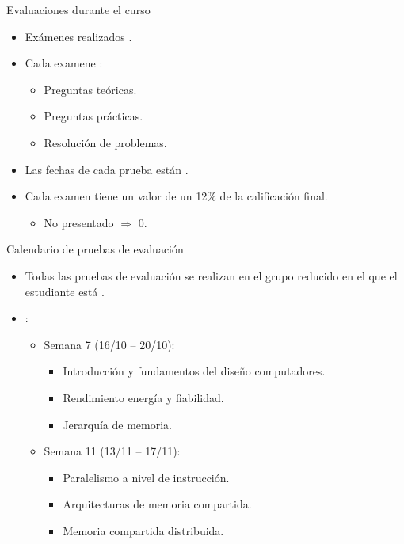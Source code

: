 \begin{frame}[t]{Evaluaciones durante el curso}
\begin{itemize}
  \item Exámenes realizados .

  \item Cada examene :
    \begin{itemize}
      \item Preguntas teóricas.
      \item Preguntas prácticas.
      \item Resolución de problemas.
    \end{itemize}

  \item Las fechas de cada prueba están .

  \item Cada examen tiene un valor de un 12\% de la calificación final.
    \begin{itemize}
      \item No presentado $\Rightarrow$ 0.
    \end{itemize}
\end{itemize}
\end{frame}

\begin{frame}[t]{Calendario de pruebas de evaluación}
\begin{itemize}
  \item Todas las pruebas de evaluación se realizan en el grupo reducido
        en el que el estudiante está .

  \vfill
  \item {}:
  \begin{itemize}
    \item Semana 7 (16/10 -- 20/10): 
      \begin{itemize}
        \item Introducción y fundamentos del diseño computadores.
        \item Rendimiento energía y fiabilidad.
        \item Jerarquía de memoria.
      \end{itemize}

    \item Semana 11 (13/11 -- 17/11):
      \begin{itemize}
        \item Paralelismo a nivel de instrucción.
        \item Arquitecturas de memoria compartida.
        \item Memoria compartida distribuida.
      \end{itemize}
  \end{itemize}
\end{itemize}
\end{frame}


